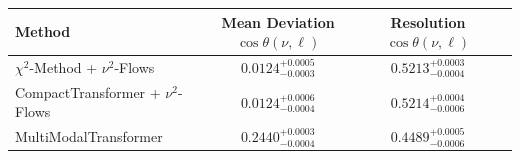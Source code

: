    \begin{tabular}{lccc}
        \toprule
        Method & Mean Deviation $\cos\theta(\nu, \ell)$ & Resolution $\cos\theta(\nu, \ell)$ \\
        \midrule
        $\chi^2$-Method + $\nu^2$-Flows & $0.0124^{+0.0005}_{-0.0003}$ & $0.5213^{+0.0003}_{-0.0004}$ \\
        CompactTransformer + $\nu^2$-Flows & $0.0124^{+0.0006}_{-0.0004}$ & $0.5214^{+0.0004}_{-0.0006}$ \\
        MultiModalTransformer & $0.2440^{+0.0003}_{-0.0004}$ & $0.4489^{+0.0005}_{-0.0006}$ \\
        \bottomrule
    \end{tabular}